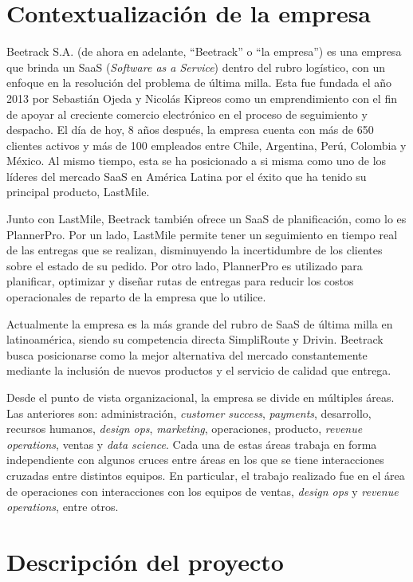 \section{Contextualización de la empresa}
    
    Beetrack S.A. (de ahora en adelante, ``Beetrack'' o ``la empresa'') es una empresa que brinda un SaaS (\textit{Software as a Service}) dentro del rubro logístico, con un enfoque en la resolución del problema de última milla. Esta fue fundada el año 2013 por Sebastián Ojeda y Nicolás Kipreos como un emprendimiento con el fin de apoyar al creciente comercio electrónico en el proceso de seguimiento y despacho. El día de hoy, 8 años después, la empresa cuenta con más de 650 clientes activos y más de 100 empleados \cite{corporateit} entre Chile, Argentina, Perú, Colombia y México. Al mismo tiempo, esta se ha posicionado a si misma como uno de los líderes del mercado SaaS en América Latina por el éxito que ha tenido su principal producto, LastMile.
    
    Junto con LastMile, Beetrack también ofrece un SaaS de planificación, como lo es PlannerPro. Por un lado, LastMile permite tener un seguimiento en tiempo real de las entregas que se realizan, disminuyendo la incertidumbre de los clientes sobre el estado de su pedido. Por otro lado, PlannerPro es utilizado para planificar, optimizar y diseñar rutas de entregas para reducir los costos operacionales de reparto de la empresa que lo utilice.
    
    Actualmente la empresa es la más grande del rubro de SaaS de última milla en latinoamérica, siendo su competencia directa SimpliRoute y Drivin. Beetrack busca posicionarse como la mejor alternativa del mercado constantemente mediante la inclusión de nuevos productos y el servicio de calidad que entrega.
    
    Desde el punto de vista organizacional, la empresa se divide en múltiples áreas. Las anteriores son: administración, \textit{customer success}, \textit{payments}, desarrollo, recursos humanos, \textit{design ops}, \textit{marketing}, operaciones, producto, \textit{revenue operations}, ventas y \textit{data science}. Cada una de estas áreas trabaja en forma independiente con algunos cruces entre áreas en los que se tiene interacciones cruzadas entre distintos equipos. En particular, el trabajo realizado fue en el área de operaciones con interacciones con los equipos de ventas, \textit{design ops} y \textit{revenue operations}, entre otros.

    
\section{Descripción del proyecto}

